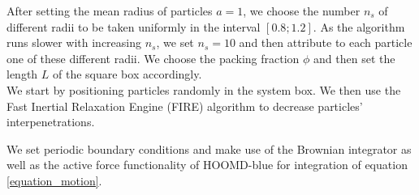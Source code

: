 \documentclass[class=report, float=false, crop=false]{standalone}
\begin{document}

After setting the mean radius of particles $a = 1$, we choose the number $n_s$ of different radii to be taken uniformly in the interval $[0.8; 1.2]$. As the algorithm runs slower with increasing $n_s$, we set $n_s = 10$ and then attribute to each particle one of these different radii. We choose the packing fraction $\phi$ and then set the length $L$ of the square box accordingly.\\

We start by positioning particles randomly in the system box. We then use the Fast Inertial Relaxation Engine (FIRE) algorithm \cite{bitzek2006structural} to decrease particles' interpenetrations.


We set periodic boundary conditions and make use of the Brownian integrator as well as the active force functionality of HOOMD-blue for integration of equation \ref{equation_motion}.
\end{document}

